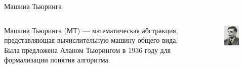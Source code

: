 \documentclass[10pt]{beamer}
\begin{document}
\begin{frame}{Машина Тьюринга}
\begin{columns}
\begin{column}{.48\linewidth}
Машина Тьюринга (МТ) — математическая абстракция, представляющая вычислительную машину общего вида. Была предложена 		Аланом Тьюрингом в 1936 году для формализации понятия алгоритма.
\end{column}
\begin{column}{.48\linewidth}
		\begin{figure}
		\centerline{\includegraphics[width=1.0\linewidth]{images/al_t.jpg}}
		\end{figure}
	\end{column}
	\end{columns}
\end{frame}


\end{document}
